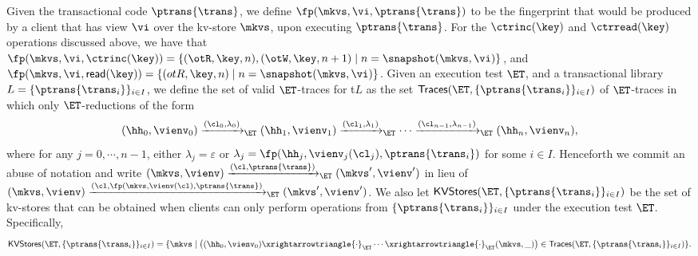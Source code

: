 Given the transactional code 
$\ptrans{\trans}$, we define $\fp(\mkvs, \vi, \ptrans{\trans})$ 
to be the fingerprint that would be produced by a client that has view $\vi$ 
over the kv-store $\mkvs$, upon executing $\ptrans{\trans}$.
For the $\ctrinc(\key)$ and $\ctrread(\key)$ operations discussed above, 
we have that 
$\fp(\mkvs, \vi, \ctrinc(\key)) = \{(\otR, \key, n), (\otW, \key, n+1) \mid 
n = \snapshot(\mkvs, \vi)\}$, and $\fp(\mkvs, \vi ,\mathsf{read}(\key)) = 
\{(otR, \key, n) \mid n = \snapshot(\mkvs, \vi)\}$.
Given an execution test $\ET$, and a transactional library $L = \{\ptrans{\trans_i}\}_{i \in I}$, 
we define the set of valid $\ET$-traces for t$L$ as the set 
$\mathsf{Traces}(\ET, \{\ptrans{\trans_i}\}_{i \in I})$ 
of $\ET$-traces in which only $\ET$-reductions of the form 
\[
(\hh_{0}, \vienv_{0}) \xrightarrow{(\cl_0, \lambda_0)}_{\ET} (\hh_{1}, \vienv_{1}) \xrightarrow{(\cl_1, \lambda_1)}_{\ET} \cdots 
\xrightarrow{(\cl_{n-1}, \lambda_{n-1})}_{\ET} (\hh_{n}, \vienv_{n}),
\]
where for any $j=0,\cdots,n-1$, either $\lambda_{j} = \varepsilon$ or $\lambda_{j} = \fp(\hh_{j}, \vienv_{j}(\cl_{j}), \ptrans{\trans_{i}})$ 
for some $i \in I$. Henceforth we commit an abuse of notation and write $(\mkvs, \vienv) \xrightarrow{(\cl, \ptrans{\trans})}_{\ET} (\mkvs', \vienv')$ 
in lieu of $(\mkvs, \vienv) \xrightarrow{(\cl, \fp(\mkvs,\vienv(\cl), \ptrans{\trans})}_{\ET} (\mkvs', \vienv')$.
We also let $\mathsf{KVStores}(\ET, \{\ptrans{\trans_i}\}_{i \in I})$ be the set of kv-stores 
that can be obtained when clients can only perform operations from $\{\ptrans{\trans_i}\}_{i \in I}$ 
under the execution test $\ET$. Specifically, 
\[
\mathsf{KVStores}(\ET, \{\ptrans{\trans_i}\}_{i \in I}) = \{ \mkvs \mid \left( (\hh_0, \vienv_{0}) \xrightarrowtriangle{\cdot}_{\ET} \cdots 
\xrightarrowtriangle{\cdot}_{\ET} (\mkvs, \_)\right) \in \mathsf{Traces}(\ET, \{\ptrans{\trans_{i}}\}_{i \in I}) \}.
\]

